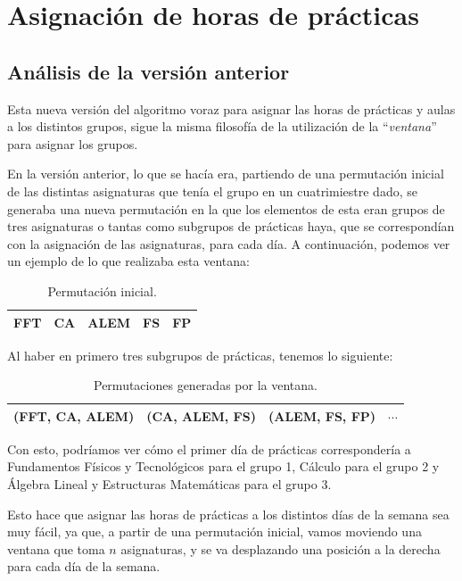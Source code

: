 \section{Asignación de horas de prácticas}

\subsection{Análisis de la versión anterior}

Esta nueva versión del algoritmo voraz para asignar las horas de prácticas y aulas a los distintos grupos, sigue la misma filosofía de la utilización de la ``\textit{ventana}'' para asignar los grupos. 

En la versión anterior, lo que se hacía era, partiendo de una permutación inicial de las distintas asignaturas que tenía el grupo en un cuatrimiestre dado, se generaba una nueva permutación en la que los elementos de esta eran grupos de tres asignaturas o tantas como subgrupos de prácticas haya, que se correspondían con la asignación de las asignaturas, para cada día. A continuación, podemos ver un ejemplo de lo que realizaba esta ventana:
\begin{table}[H]
\begin{center}
\begin{tabular}{|c|c|c|c|c|}
\hline
FFT & CA & ALEM & FS & FP\\
\hline
\end{tabular}
\caption{Permutación inicial.}
\end{center}
\end{table}
Al haber en primero tres subgrupos de prácticas, tenemos lo siguiente:
\begin{table}[H]
\begin{center}
\begin{tabular}{|c|c|c|c|}
\hline
(FFT, CA, ALEM) & (CA, ALEM, FS) & (ALEM, FS, FP) & $\cdots$ \\
\hline
\end{tabular}
\caption{Permutaciones generadas por la ventana.}
\end{center}
\end{table}

Con esto, podríamos ver cómo el primer día de prácticas correspondería a Fundamentos Físicos y Tecnológicos para el grupo 1, Cálculo para el grupo 2 y Álgebra Lineal y Estructuras Matemáticas para el grupo 3.

Esto hace que asignar las horas de prácticas a los distintos días de la semana sea muy fácil, ya que, a partir de una permutación inicial, vamos moviendo una ventana que toma $n$ asignaturas, y se va desplazando una posición a la derecha para cada día de la semana. 

